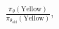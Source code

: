 \documentclass[preview]{standalone}
\begin{document}
\begin{align*}
\frac{\pi_\theta(\text{Yellow})}{\pi_{\theta_{\text{old}}}(\text{Yellow})},
\end{align*}
\end{document}
